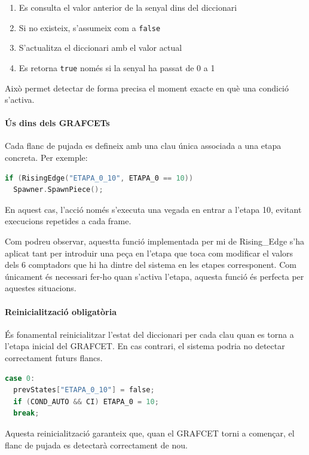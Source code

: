 \documentclass[12pt,a4paper]{report}
\begin{document}
\begin{enumerate}
\item Es consulta el valor anterior de la senyal dins del diccionari
\item Si no existeix, s'assumeix com a \texttt{false}
\item S'actualitza el diccionari amb el valor actual
\item Es retorna \texttt{true} només si la senyal ha passat de 0 a 1
\end{enumerate}

Això permet detectar de forma precisa el moment exacte en què una condició s'activa.

\paragraph{Ús dins dels GRAFCETs}

Cada flanc de pujada es defineix amb una clau única associada a una etapa concreta. Per exemple:

\begin{lstlisting}[language=C]
if (RisingEdge("ETAPA_0_10", ETAPA_0 == 10))
  Spawner.SpawnPiece();
\end{lstlisting}

En aquest cas, l'acció només s'executa una vegada en entrar a l'etapa 10, evitant execucions repetides a cada frame.

Com podreu observar, aquestta funció implementada per mi de Rising\_Edge s'ha aplicat tant per introduir una peça en l'etapa que toca com modificar el valors dels 6 comptadors que hi ha dintre del sistema en les etapes corresponent. Com únicament és necessari fer-ho quan s'activa l'etapa, aquesta funció és perfecta per aquestes situacions.

\paragraph{Reinicialització obligatòria}

És fonamental reinicialitzar l'estat del diccionari per cada clau quan es torna a l'etapa inicial del GRAFCET. En cas contrari, el sistema podria no detectar correctament futurs flancs.

\begin{lstlisting}[language=C]
case 0:
  prevStates["ETAPA_0_10"] = false;
  if (COND_AUTO && CI) ETAPA_0 = 10;
  break;
\end{lstlisting}

Aquesta reinicialització garanteix que, quan el GRAFCET torni a començar, el flanc de pujada es detectarà correctament de nou.
\end{document}
